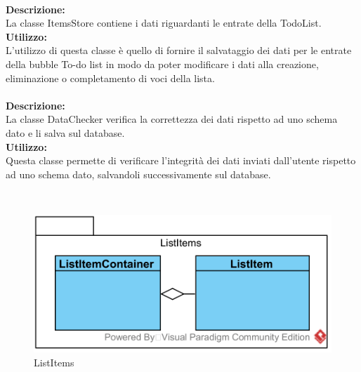 \label{todo-itemsstore}\mbox{}\\
\textbf{Descrizione:}\\
La classe ItemsStore contiene i dati riguardanti le entrate della TodoList.\\
\textbf{Utilizzo:}\\
L'utilizzo di questa classe è quello di fornire il salvataggio dei dati per le entrate della bubble To-do list in modo da poter modificare i dati alla creazione, eliminazione o completamento di voci della lista.\\

\label{todo-datachecker}\mbox{}\\
\textbf{Descrizione:}\\
La classe DataChecker verifica la correttezza dei dati rispetto ad uno schema dato e li salva sul database.\\
\textbf{Utilizzo:}\\
Questa classe permette di verificare l'integrità dei dati inviati dall'utente rispetto ad uno schema dato, salvandoli successivamente sul database.

\mbox{}\\ \label{todo-item-model}
\begin{figure}[H]
	\centering
	\includegraphics[width=14cm]{../../documenti/SpecificaTecnica/diagrammi_img/classi_e_package/todo_listitems.png}
	\caption{List\-Items}
\end{figure}

